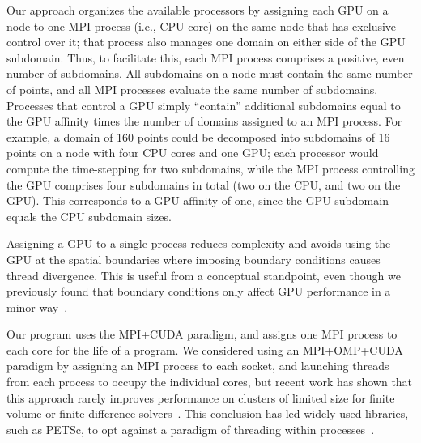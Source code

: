 Our approach organizes the available processors by assigning each GPU on a node to one
MPI process (i.e., CPU core) on the same node that has exclusive control over it; that process also
manages one domain on either side of the GPU subdomain.
Thus, to facilitate this, each MPI process comprises a positive, even number of subdomains.
All subdomains on a node must contain the same number of points, and all MPI processes evaluate the
same number of subdomains.
Processes that control a GPU simply ``contain'' additional subdomains equal to the GPU affinity times
the number of domains assigned to an MPI process.
For example, a domain of 160 points could be decomposed into subdomains of 16 points on a node with
four CPU cores and one GPU; each processor would compute the time-stepping for two subdomains, while the
MPI process controlling the GPU comprises four subdomains in total (two on the CPU, and two on the GPU).
This corresponds to a GPU affinity of one, since the GPU subdomain equals the CPU subdomain sizes.

Assigning a GPU to a single process reduces complexity and avoids using the GPU at the spatial
boundaries where imposing boundary conditions causes thread divergence.
This is useful from a conceptual standpoint, even though we previously found that boundary
conditions only affect GPU performance in a minor way~\cite{OurJCP}.

Our program uses the MPI\allowbreak+CUDA paradigm, and assigns one MPI process to each core for the life of a program.
We considered using an MPI\allowbreak+OMP\allowbreak+CUDA paradigm by assigning an MPI process to each socket, and
launching threads from each process to occupy the individual cores, but recent work has shown that
this approach rarely improves performance on clusters of limited size for finite volume or finite
difference solvers~\cite{IDAHO_MPI_CUDA, PerfAnalysisHetero}.
This conclusion has led widely used libraries, such as PETSc, to opt against a paradigm of threading
within processes~\cite{MillsPetsc}.
